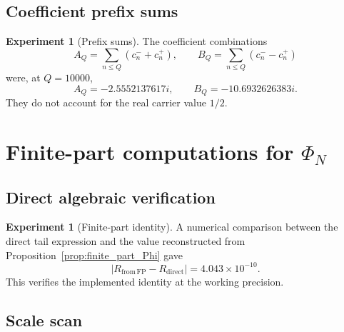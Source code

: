 \documentclass[11pt]{amsart}
\numberwithin{equation}{section}
\theoremstyle{plain}
\theoremstyle{definition}
\newtheorem{experiment}[theorem]{Experiment}
\theoremstyle{remark}
\newcommand{\1}{\mathbf{1}}
\begin{document}
\subsection{Coefficient prefix sums}
\label{subsec:numerical_coefficient_prefixes}

\begin{experiment}[Prefix sums]
\label{exp:numerical_prefix_sums}
The coefficient combinations
\begin{equation}
A_Q=\sum_{n\leq Q}(c_n^-+c_n^+),
\qquad
B_Q=\sum_{n\leq Q}(c_n^--c_n^+)
\label{eq:numerical_AQ_BQ}
\end{equation}
were, at $Q=10000$,
\begin{equation}
A_Q=-2.5552137617i,
\qquad
B_Q=-10.6932626383i.
\label{eq:numerical_AQ_BQ_values_detailed}
\end{equation}
They do not account for the real carrier value $1/2$.
\end{experiment}

\section{Finite-part computations for $\Phi_N$}
\label{sec:numerical_finite_parts}

\subsection{Direct algebraic verification}
\label{subsec:numerical_finite_part_verification}

\begin{experiment}[Finite-part identity]
\label{exp:numerical_finite_part_identity}
A numerical comparison between the direct tail expression and the value
reconstructed from Proposition~\ref{prop:finite_part_Phi} gave
\begin{equation}
|R_{\mathrm{from\,FP}}-R_{\mathrm{direct}}|
=4.043\times10^{-10}.
\label{eq:numerical_finite_part_error_detailed}
\end{equation}
This verifies the implemented identity at the working precision.
\end{experiment}

\subsection{Scale scan}
\label{subsec:numerical_finite_part_scale_scan}
\end{document}
